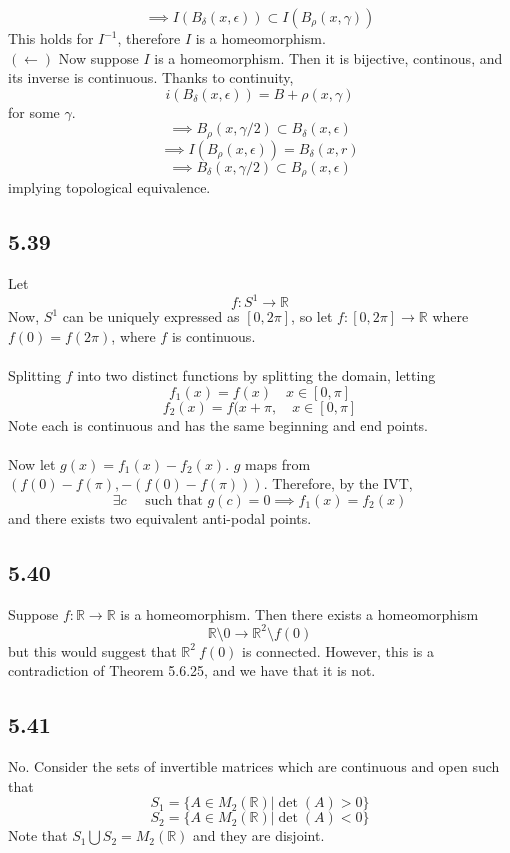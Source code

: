 \documentclass[letterpaper,12pt]{article}
\theoremstyle{definition}
\begin{document}
\[\implies I(B_\delta (x, \epsilon)) \subset I(B_\rho(x, \gamma))\]
This holds for $I ^{-1}$, therefore $I$ is a homeomorphism.\\
$(\leftarrow)$ Now suppose $I$ is a homeomorphism. Then it is bijective, continous, and its inverse is continuous. Thanks to continuity,
\[i(B_\delta(x, \epsilon)) = B+\rho(x, \gamma)\]
for some $\gamma$.\\
\[\implies B_\rho(x,\gamma /2) \subset B_\delta (x, \epsilon)\]
\[\implies   I(B_\rho (x, \epsilon)) = B_\delta(x, r)\]
\[\implies B_\delta(x, \gamma / 2 ) \subset B_\rho (x , \epsilon)\]
implying topological equivalence.

\subsection*{5.39}
Let 
\[f:S^1 \to \mathbb{R}\]
Now, $S^1$ can be uniquely expressed as $[0,2\pi]$, so let $f:[0,2\pi] \to \mathbb{R}$ where $f(0) = f(2\pi)$, where $f$ is continuous.\\\\
Splitting $f$ into two distinct functions by splitting the domain, letting 
\[f_1(x) = f(x)\quad x\in [0,\pi]\]
\[f_2(x) = f(x+\pi, \quad x \in [0,\pi]\] Note each is continuous and has the same beginning and end points. \\\\

Now let $g(x) =  f_1(x) - f_2(x)$. $g$ maps from $(f(0) - f(\pi), -(f(0) - f(\pi)))$. Therefore, by the IVT, 
\[\exists c \quad \text{ such that } g(c) = 0 \implies f_1(x) = f_2(x)\] 
and there exists two equivalent anti-podal points.


\subsection*{5.40}


Suppose $f: \mathbb{R} \to \mathbb{R}$ is a homeomorphism. Then there exists a homeomorphism
\[\mathbb{R} \setminus 0 \to \mathbb{R}^2 \setminus f(0)\] but this would suggest that $\mathbb{R}^2\ f(0)$ is connected. However, this is a contradiction of Theorem 5.6.25, and we have that it is not.

\subsection*{5.41}
No. Consider the sets of invertible matrices which are continuous and open such that
\[S_1 = \{A \in M_2(\mathbb{R})| \det(A) > 0\}\]
\[S_2 = \{A \in M_2(\mathbb{R})| \det(A) < 0\}\]
Note that $S_1 \bigcup S_2 = M_2(\mathbb{R})$ and they are disjoint.
\end{document}
